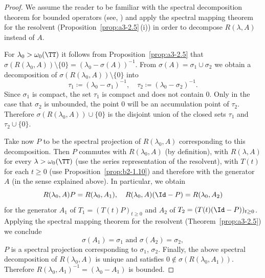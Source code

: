 \begin{proof}
We assume the reader to be familiar with the spectral decomposition theorem for bounded operators (see, \eg \textcite[p.572]{dunfordschwartz:1958}) and apply the spectral mapping theorem for the resolvent (Proposition~\ref{prop:a3-2.5}\,(i)) in order to decompose $R(\lambda,A)$ instead of\/ $A$.

For $\lambda_{0} > \omega_{0}(\TT)$ it follows from Proposition~\ref{prop:a3-2.5} that $\sigma(R(\lambda_{0},A)) \setminus \{0\} = (\lambda_{0} - \sigma(A))^{-1}$.
From $\sigma(A) = \sigma_{1} \cup \sigma_{2}$ we obtain a decomposition of\/ $\sigma(R(\lambda_{0},A)) \setminus \{0\}$ into
\[
	\tau_{1} \coloneqq (\lambda_{0} - \sigma_{1})^{-1}, 
		\quad 
	\tau_{2} \coloneqq (\lambda_{0} - \sigma_{2})^{-1} .
\]
Since $\sigma_{1}$ is compact, the set $\tau_{1}$ is compact and does not contain $0$.
Only in the case that $\sigma_{2}$ is unbounded, the point $0$ will be an accumulation point of\/ $\tau_{2}$.
Therefore $\sigma(R(\lambda_{0},A)) \cup \{0\}$ is the disjoint union of the closed sets $\tau_{1}$ and $\tau_{2} \cup \{0\}$.

Take now $P$ to be the spectral projection of\/ $R(\lambda_{0},A)$ corresponding to this decomposition.
Then $P$ commutes with $R(\lambda_{0},A)$ (by definition), with $R(\lambda,A)$ for every $\lambda > \omega_{0}(\TT)$ (use the series representation of the resolvent), with $T(t)$ for each $t \geq 0$ (use Proposition~\ref{prop:b2-1.10}) and therefore with the generator $A$ (in the sense explained above).
In particular, we obtain
\begin{equation*}\label{eq:a3-new}
R(\lambda_{0},A)P = R(\lambda_{0},A_{1}), \quad R(\lambda_{0},A)(\Id-P) = R(\lambda_{0},A_{2})
\end{equation*}
for the generator $A_{1}$ of\/ $T_{1} = (T(t)P)_{t \geq 0}$ and $A_{2}$ of\/ $T_{2} = (T(t)(\Id-P))_{t \geq 0}$.
Applying the spectral mapping theorem for the resolvent (Theorem~\ref{prop:a3-2.5})
we conclude
\[
\sigma(A_{1}) = \sigma_{1} \text{ and } \sigma(A_{2}) = \sigma_{2} ,
\]
\ie $P$ is a spectral projection corresponding to $\sigma_{1}$, $\sigma_{2}$.
Finally, the above spectral decomposition of\/ $R(\lambda_{0},A)$ is unique and satisfies $0 \notin \sigma(R(\lambda_{0},A_{1}))$.
Therefore $R(\lambda_{0},A_{1})^{-1} = (\lambda_{0}-A_{1})$ is bounded.
\end{proof}
